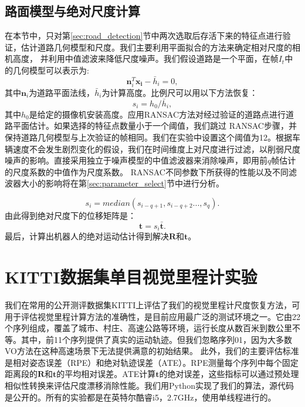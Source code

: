\subsection{路面模型与绝对尺度计算}
\label{sec:road_model}
在本节中，只对第\ref{sec:road_detection}节中两次选取后存活下来的特征点进行验证，估计道路几何模型和尺度。我们主要利用平面拟合的方法来确定相对尺度的相机高度，
并利用中值滤波来降低尺度噪声。我们假设道路是一个平面，在帧$I_t$中的几何模型可以表示为:
\begin{equation}
    \mathbf{n}^T_i\mathbf{x_i}-\bar{h}_{i}=0,
    \label{eq:road_model}
\end{equation}
其中$\mathbf{n}_i$为道路平面法线，$\bar{h}_{i}$为计算高度。比例尺可以用以下方法恢复：
\begin{equation}
    s_i = h_0/\bar{h}_i,
    \label{eq:scale}
\end{equation}
其中$h_0$是给定的摄像机安装高度。应用RANSAC方法\cite{FISCHLER1981Random}对经过验证的道路点进行道路平面估计。如果选择的特征点数量小于一个阈值，我们跳过
RANSAC步骤，并保持道路几何模型与上次验证的帧相同。我们在实验中设置这个阈值为12。根据车辆速度不会发生剧烈变化的假设，我们在时间维度上对尺度进行过滤，以削弱尺度
噪声的影响。直接采用独立于噪声模型的中值滤波器来消除噪声，即用前$q$帧估计的尺度系数的中值作为尺度系数。
RANSAC不同参数下所获得的性能以及不同滤波器大小的影响将在第\ref{sec:parameter_select}节中进行分析。

\begin{equation}
    s_i = median({s_{i-q+1},s_{i-q+2}...,s_{q}})
    \label{eq:scale_median}.
\end{equation}
由此得到绝对尺度下的位移矩阵是：
\begin{equation}
    \mathbf{t} = s_i\bar{\mathbf{t}}.
    \label{eq:absolute_t}
\end{equation}
最后，计算出机器人的绝对运动估计得到解决$\mathbf{R}$和$\mathbf{t}$。

\section{KITTI数据集单目视觉里程计实验}
我们在常用的公开测评数据集KITTI\cite{geiger2012we}上评估了我们的视觉里程计尺度恢复方法，可用于评估视觉里程计算方法的准确性，是目前应用最广泛的测试环境之一。它由22个序列组成，覆盖了城市、村庄、高速公路等环境，运行长度从数百米到数公里不等。其中，前11个序列提供了真实的运动轨迹。但我们忽略序列01，因为大多数VO方法在这种高速场景下无法提供满意的初始结果。
此外，我们的主要评估标准是相对姿态误差（RPE）\cite{geiger2012we}和绝对轨迹误差（ATE）\cite{sturm2012benchmark}。RPE测量每个序列中每个固定距离段的$\mathbf{R}$和$\mathbf{t}$的平均相对误差。ATE计算$\mathbf{t}$的绝对误差，这些指标可以通过预处理相似性转换\cite{raul2015orb}来评估尺度漂移消除性能。我们用Python实现了我们的算法，源代码是公开的。所有的实验都是在英特尔酷睿i5，2.7GHz，使用单线程进行的。

